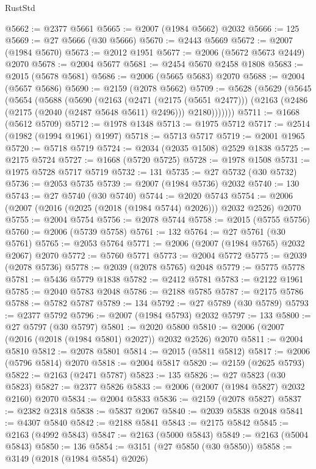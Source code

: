 \begin{lexlean}{RustStd}
\begin{coremodule}
@5662 := @2377 @5661
@5665 := @2007 (@1984 @5662) @2032
@5666 := 125
@5669 := @27 @5666 (@30 @5666)
@5670 := @2443 @5669
@5672 := @2007 (@1984 @5670)
@5673 := @2012 @1951
@5677 := @2006 (@5672 @5673 @2449) @2070
@5678 := @2004 @5677
@5681 := @2454 @5670 @2458 @1808
@5683 := @2015 (@5678 @5681)
@5686 := @2006 (@5665 @5683) @2070
@5688 := @2004 (@5657 @5686)
@5690 := @2159 (@2078 @5662)
@5709 := @5628
    (@5629
      (@5645
        (@5654
          (@5688
            (@5690
              (@2163
                (@2471 (@2175 (@5651 @2477)))
                (@2163 (@2486 (@2175 (@2040 (@2487 @5648 @5611) @2496))) @2180)))))))
@5711 := @1668 (@5612 @5709)
@5712 := @1978 @1348
@5713 := @1975 @5712
@5717 := @2514 (@1982 (@1994 @1961) @1997)
@5718 := @5713 @5717
@5719 := @2001 @1965
@5720 := @5718 @5719
@5724 := @2034 (@2035 @1508) @2529 @1838
@5725 := @2175 @5724
@5727 := @1668 (@5720 @5725)
@5728 := @1978 @1508
@5731 := @1975 @5728 @5717 @5719
@5732 := 131
@5735 := @27 @5732 (@30 @5732)
@5736 := @2053 @5735
@5739 := @2007 (@1984 @5736) @2032
@5740 := 130
@5743 := @27 @5740 (@30 @5740)
@5744 := @2020 @5743
@5754 := @2006 (@2007 (@2016 (@2025 (@2018 (@1984 @5744) @2026))) @2032 @2526) @2070
@5755 := @2004 @5754
@5756 := @2078 @5744
@5758 := @2015 (@5755 @5756)
@5760 := @2006 (@5739 @5758)
@5761 := 132
@5764 := @27 @5761 (@30 @5761)
@5765 := @2053 @5764
@5771 := @2006 (@2007 (@1984 @5765) @2032 @2067) @2070
@5772 := @5760 @5771
@5773 := @2004 @5772
@5775 := @2039 (@2078 @5736)
@5778 := @2039 (@2078 @5765) @2048
@5779 := @5775 @5778
@5781 := @5436 @5779 @1838
@5782 := @2412 @5781
@5783 := @2122 @1961
@5785 := @2040 @5783 @2048
@5786 := @2188 @5785
@5787 := @2175 @5786
@5788 := @5782 @5787
@5789 := 134
@5792 := @27 @5789 (@30 @5789)
@5793 := @2377 @5792
@5796 := @2007 (@1984 @5793) @2032
@5797 := 133
@5800 := @27 @5797 (@30 @5797)
@5801 := @2020 @5800
@5810 := @2006 (@2007 (@2016 (@2018 (@1984 @5801) @2027)) @2032 @2526) @2070
@5811 := @2004 @5810
@5812 := @2078 @5801
@5814 := @2015 (@5811 @5812)
@5817 := @2006 (@5796 @5814) @2070
@5818 := @2004 @5817
@5820 := @2159 (@2625 @5793)
@5822 := @2163 (@2471 @5787)
@5823 := 135
@5826 := @27 @5823 (@30 @5823)
@5827 := @2377 @5826
@5833 := @2006 (@2007 (@1984 @5827) @2032 @2160) @2070
@5834 := @2004 @5833
@5836 := @2159 (@2078 @5827)
@5837 := @2382 @2318
@5838 := @5837 @2067
@5840 := @2039 @5838 @2048
@5841 := @4307 @5840
@5842 := @2188 @5841
@5843 := @2175 @5842
@5845 := @2163 (@4992 @5843)
@5847 := @2163 (@5000 @5843)
@5849 := @2163 (@5004 @5843)
@5850 := 136
@5854 := @3151 (@27 @5850 (@30 @5850))
@5858 := @3149 (@2018 (@1984 @5854) @2026)

\end{coremodule}
\end{lexlean}
